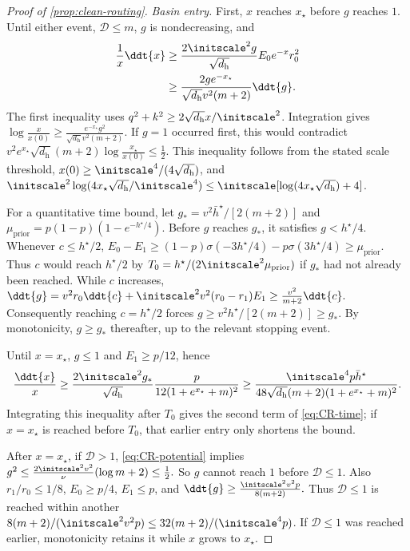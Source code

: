 \begin{proof}[Proof of \cref{prop:clean-routing}]
\emph{Basin entry.}
First, $x$ reaches $x_\star$ before $g$ reaches $1$. Until either event, $\mathcal D\le m$, $g$ is nondecreasing, and
\begin{align*}
 \frac1x\ddt{x}&\ge\frac{2\initscale^2g}{\sqrt{d_{\mathrm h}}}E_0e^{-x}r_0^2\\
 &\ge\frac{2ge^{-x_\star}}{\sqrt{d_{\mathrm h}}v^2(m+2)}\ddt{g}.
\end{align*} 
The first inequality uses $q^2+k^2\ge2\sqrt{d_{\mathrm h}}x/\initscale^2$.
Integration gives
 $\log\frac{x}{x(0)}\ge\frac{e^{-x_\star}g^2}{\sqrt{d_{\mathrm h}}v^2(m+2)}.$ 
If $g=1$ occurred first, this would contradict
 $v^2e^{x_\star}\sqrt{d_{\mathrm h}}(m+2)\log\frac{x_\star}{x(0)}\le\frac12.$ 
This inequality follows from the stated scale threshold, $x(0)\ge\initscale^4/(4\sqrt{d_{\mathrm h}})$, and
$\initscale^2\log(4x_\star\sqrt{d_{\mathrm h}}/\initscale^4)\le\initscale[\log(4x_\star\sqrt{d_{\mathrm h}})+4]$.

For a quantitative time bound, let $g_*=v^2\bar h^\star/[2(m+2)]$ and
$\mu_{\mathrm{prior}}=p(1-p)(1-e^{-h^\star/4})$.
Before $g$ reaches $g_*$, it satisfies $g<h^\star/4$. Whenever $c\le h^\star/2$,
 $E_0-E_1\ge(1-p)\sigma(-3h^\star/4)-p\sigma(3h^\star/4)\ge\mu_{\mathrm{prior}}.$ 
Thus $c$ would reach $h^\star/2$ by $T_0=h^\star/(2\initscale^2\mu_{\mathrm{prior}})$ if $g_*$ had not already been reached.
While $c$ increases,
 $\ddt{g}=v^2r_0\ddt{c}+\initscale^2v^2(r_0-r_1)E_1\ge\frac{v^2}{m+2}\ddt{c}.$ 
Consequently reaching $c=h^\star/2$ forces $g\ge v^2h^\star/[2(m+2)]\ge g_*$.
By monotonicity, $g\ge g_*$ thereafter, up to the relevant stopping event.

Until $x=x_\star$, $g\le1$ and $E_1\ge p/12$, hence
\[
 \frac{\ddt{x}}{x}\ge\frac{2\initscale^2g_*}{\sqrt{d_{\mathrm h}}}
       \frac{p}{12(1+e^{x_\star}+m)^2}
 \ge\frac{\initscale^4p\bar h^\star}{48\sqrt{d_{\mathrm h}}(m+2)(1+e^{x_\star}+m)^2}.
\]
Integrating this inequality after $T_0$ gives the second term of \cref{eq:CR-time}; if $x=x_\star$ is reached before $T_0$,
that earlier entry only shortens the bound.

After $x=x_\star$, if $\mathcal D>1$, \eqref{eq:CR-potential} implies
 $g^2\le\frac{2\initscale^2v^2}{\nu}(\log m+2)\le\frac12.$ 
So $g$ cannot reach $1$ before $\mathcal D\le1$. Also $r_1/r_0\le1/8$, $E_0\ge p/4$, $E_1\le p$, and
 $\ddt{g}\ge\frac{\initscale^2v^2 p}{8(m+2)}.$ 
Thus $\mathcal D\le1$ is reached within another $8(m+2)/(\initscale^2v^2 p)\le32(m+2)/(\initscale^4p)$.
If $\mathcal D\le1$ was reached earlier, monotonicity retains it while $x$ grows to $x_\star$.


\end{proof}
